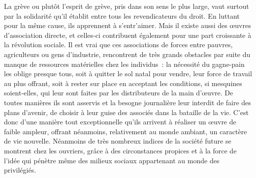 \documentclass[french,twoside]{book} %
\begin{document}
La grève ou plutôt l’esprit de grève, pris dans son sens le plus large, vaut surtout par la solidarité qu’il établit entre  tous les revendicateurs du droit. En luttant pour la même cause, ils apprennent à s’entr’aimer. Mais il existe aussi des œuvres d’association directe, et celles-ci contribuent également pour une part croissante à la révolution sociale. Il est vrai que ces associations de forces entre pauvres, agriculteurs ou gens d’industrie, rencontrent de très grands obstacles par suite du manque de ressources matérielles chez les individus : la nécessité du gagne-pain les oblige presque tous, soit à quitter le sol natal pour vendre, leur force de travail au plus offrant, soit à rester sur place en acceptant les conditions, si mesquines soient-elles, qui leur sont faites par les distributeurs de la main d’œuvre. De toutes manières ils sont asservis et la  besogne journalière leur interdit de faire des plans d’avenir, de choisir à leur guise des associés dans la bataille de la vie. C’est donc d’une manière tout exceptionnelle qu’ils arrivent à réaliser un œuvre de faible ampleur, offrant néanmoins, relativement au monde ambiant, un caractère de vie nouvelle. Néanmoins de très nombreux indices de la société future se montrent chez les ouvriers, grâce à des circonstances propices et à la force de l’idée qui pénètre même des milieux sociaux appartenant au monde des privilégiés.\par
\end{document}
